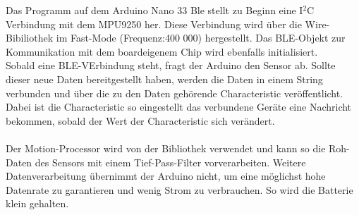 Das Programm auf dem Arduino Nano 33 Ble stellt zu Beginn eine 
I$^2$C Verbindung mit dem MPU9250 her. Diese Verbindung wird über
die Wire-Bibiliothek im Fast-Mode (Frequenz:400 000) hergestellt. 
Das BLE-Objekt zur Kommunikation
mit dem boardeigenem Chip wird ebenfalls initialisiert. \\
Sobald eine BLE-VErbindung steht, fragt der Arduino
den Sensor ab. Sollte dieser neue Daten 
bereitgestellt haben, werden die Daten in einem String 
verbunden und über die zu den Daten gehörende Characteristic 
veröffentlicht.\\ Dabei ist die Characteristic so eingestellt das 
verbundene Geräte eine Nachricht bekommen, sobald der Wert 
der Characteristic sich verändert.\\
\\
Der Motion-Processor wird von der Bibliothek verwendet und 
kann so die Roh-Daten des Sensors mit einem Tief-Pass-Filter
vorverarbeiten. Weitere Datenverarbeitung übernimmt der 
Arduino nicht, um eine möglichst hohe Datenrate zu garantieren und wenig
Strom zu verbrauchen. So wird die Batterie klein gehalten.
